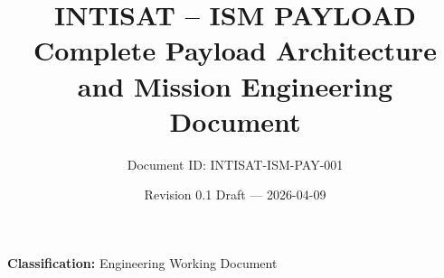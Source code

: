 \documentclass[11pt,a4paper]{article}
\title{\textbf{INTISAT -- ISM PAYLOAD}\\
\large Complete Payload Architecture and Mission Engineering Document}
\author{Document ID: INTISAT-ISM-PAY-001}
\date{Revision 0.1 Draft --- 2026-04-09}
\begin{document}
\maketitle
\thispagestyle{fancy}

\begin{center}
\textbf{Classification:} Engineering Working Document
\end{center}





















\end{document}
